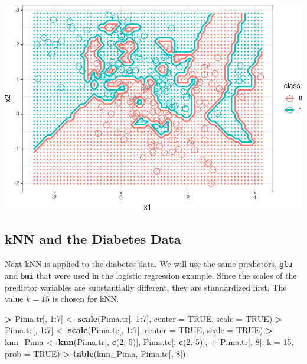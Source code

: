 \documentclass[]{krantz}
\makeatletter
\newenvironment{Shaded}{\begin{snugshade}}{\end{snugshade}}
\newcommand{\DataTypeTok}[1]{\textcolor[rgb]{0.27,0.27,0.27}{#1}}
\newcommand{\DecValTok}[1]{\textcolor[rgb]{0.06,0.06,0.06}{#1}}
\newcommand{\KeywordTok}[1]{\textcolor[rgb]{0.27,0.27,0.27}{\textbf{#1}}}
\newcommand{\NormalTok}[1]{#1}
\newcommand{\OperatorTok}[1]{\textcolor[rgb]{0.43,0.43,0.43}{\textbf{#1}}}
\newcommand{\OtherTok}[1]{\textcolor[rgb]{0.37,0.37,0.37}{#1}}
\newcommand{\StringTok}[1]{\textcolor[rgb]{0.5,0.5,0.5}{#1}}
\newenvironment{kframe}{%
\medskip{}
\setlength{\fboxsep}{.8em}
 \def\at@end@of@kframe{}%
 \ifinner\ifhmode%
  \def\at@end@of@kframe{\end{minipage}}%
  \begin{minipage}{\columnwidth}%
 \fi\fi%
 \def\FrameCommand##1{\hskip\@totalleftmargin \hskip-\fboxsep
 \colorbox{shadecolor}{##1}\hskip-\fboxsep
     \hskip-\linewidth \hskip-\@totalleftmargin \hskip\columnwidth}%
 \MakeFramed {\advance\hsize-\width
   \@totalleftmargin\z@ \linewidth\hsize
   \@setminipage}}%
 {\par\unskip\endMakeFramed%
 \at@end@of@kframe}
\renewenvironment{Shaded}{\begin{kframe}}{\end{kframe}}
\makeatother
\begin{document}
\includegraphics{bookdown_files/figure-latex/unnamed-chunk-240-1.pdf}

\hypertarget{knn-and-the-diabetes-data}{%
\subsection{kNN and the Diabetes Data}\label{knn-and-the-diabetes-data}}

Next kNN is applied to the diabetes data. We will use the same predictors, \texttt{glu} and \texttt{bmi} that were used in the logistic regression example. Since the scales of the predictor variables are substantially different, they are standardized first. The value \(k=15\) is chosen for kNN.

\begin{Shaded}
\begin{Highlighting}[]
\OperatorTok{>}\StringTok{ }\NormalTok{Pima.tr[, }\DecValTok{1}\OperatorTok{:}\DecValTok{7}\NormalTok{] <-}\StringTok{ }\KeywordTok{scale}\NormalTok{(Pima.tr[, }\DecValTok{1}\OperatorTok{:}\DecValTok{7}\NormalTok{], }\DataTypeTok{center =} \OtherTok{TRUE}\NormalTok{, }\DataTypeTok{scale =} \OtherTok{TRUE}\NormalTok{)}
\OperatorTok{>}\StringTok{ }\NormalTok{Pima.te[, }\DecValTok{1}\OperatorTok{:}\DecValTok{7}\NormalTok{] <-}\StringTok{ }\KeywordTok{scale}\NormalTok{(Pima.te[, }\DecValTok{1}\OperatorTok{:}\DecValTok{7}\NormalTok{], }\DataTypeTok{center =} \OtherTok{TRUE}\NormalTok{, }\DataTypeTok{scale =} \OtherTok{TRUE}\NormalTok{)}
\OperatorTok{>}\StringTok{ }\NormalTok{knn_Pima <-}\StringTok{ }\KeywordTok{knn}\NormalTok{(Pima.tr[, }\KeywordTok{c}\NormalTok{(}\DecValTok{2}\NormalTok{, }\DecValTok{5}\NormalTok{)], Pima.te[, }\KeywordTok{c}\NormalTok{(}\DecValTok{2}\NormalTok{, }\DecValTok{5}\NormalTok{)], }
\OperatorTok{+}\StringTok{   }\NormalTok{Pima.tr[, }\DecValTok{8}\NormalTok{], }\DataTypeTok{k =} \DecValTok{15}\NormalTok{, }\DataTypeTok{prob =} \OtherTok{TRUE}\NormalTok{)}
\OperatorTok{>}\StringTok{ }\KeywordTok{table}\NormalTok{(knn_Pima, Pima.te[, }\DecValTok{8}\NormalTok{])}
\end{Highlighting}
\end{Shaded}
\end{document}
